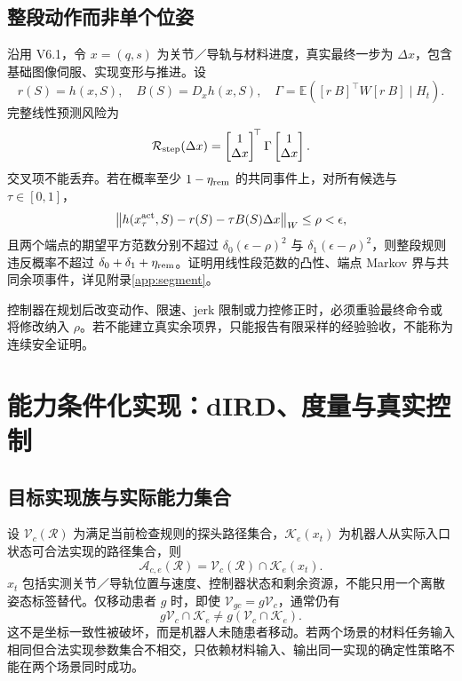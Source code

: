 \documentclass[UTF8,fontset=fandol,11pt,a4paper]{ctexart}
\theoremstyle{plain}
\theoremstyle{definition}
\theoremstyle{remark}
\numberwithin{equation}{section}
\newcommand{\E}{\mathbb E}
\newcommand{\cR}{\mathcal R}
\newcommand{\norm}[1]{\left\lVert#1\right\rVert}
\begin{document}
\subsection{整段动作而非单个位姿}
沿用 V6.1\cite{v61}，令 $x=(q,s)$ 为关节／导轨与材料进度，真实最终一步为 $\Delta x$，包含基础图像伺服、实现变形与推进。设
\begin{equation}
 r(S)=h(x,S),\quad B(S)=D_xh(x,S),\quad
 \Gamma=\E\left([r\ B]^\top W[r\ B]\mid H_t\right).
\end{equation}
完整线性预测风险为
\begin{equation}
 \cR_{\rm step}(\Delta x)=
 \begin{bmatrix}1\\\Delta x\end{bmatrix}^{\!\top}
 \Gamma
 \begin{bmatrix}1\\\Delta x\end{bmatrix}.
 \label{eq:step}
\end{equation}
交叉项不能丢弃。若在概率至少 $1-\eta_{\rm rem}$ 的共同事件上，对所有候选与 $\tau\in[0,1]$，
\begin{equation}
 \norm{h(x_\tau^{\rm act},S)-r(S)-\tau B(S)\Delta x}_W\le\rho<\epsilon,
 \label{eq:remainder}
\end{equation}
且两个端点的期望平方范数分别不超过 $\delta_0(\epsilon-\rho)^2$ 与 $\delta_1(\epsilon-\rho)^2$，则整段规则违反概率不超过 $\delta_0+\delta_1+\eta_{\rm rem}$。证明用线性段范数的凸性、端点 Markov 界与共同余项事件，详见附录\ref{app:segment}。

控制器在规划后改变动作、限速、jerk 限制或力控修正时，必须重验最终命令或将修改纳入 $\rho$。若不能建立真实余项界，只能报告有限采样的经验验收，不能称为连续安全证明。

\section{能力条件化实现：dIRD、度量与真实控制}
\label{sec:realize}
\subsection{目标实现族与实际能力集合}
设 $\mathcal V_c(\cR)$ 为满足当前检查规则的探头路径集合，$\mathcal K_e(x_t)$ 为机器人从实际入口状态可合法实现的路径集合，则
\begin{equation}
 \mathcal A_{c,e}(\cR)=\mathcal V_c(\cR)\cap\mathcal K_e(x_t).
 \label{eq:intersection}
\end{equation}
$x_t$ 包括实测关节／导轨位置与速度、控制器状态和剩余资源，不能只用一个离散姿态标签替代。仅移动患者 $g$ 时，即使 $\mathcal V_{gc}=g\mathcal V_c$，通常仍有
\begin{equation}
 g\mathcal V_c\cap\mathcal K_e\ne g(\mathcal V_c\cap\mathcal K_e).
 \label{eq:physicalchange}
\end{equation}
这不是坐标一致性被破坏，而是机器人未随患者移动。若两个场景的材料任务输入相同但合法实现参数集合不相交，只依赖材料输入、输出同一实现的确定性策略不能在两个场景同时成功。
\end{document}
